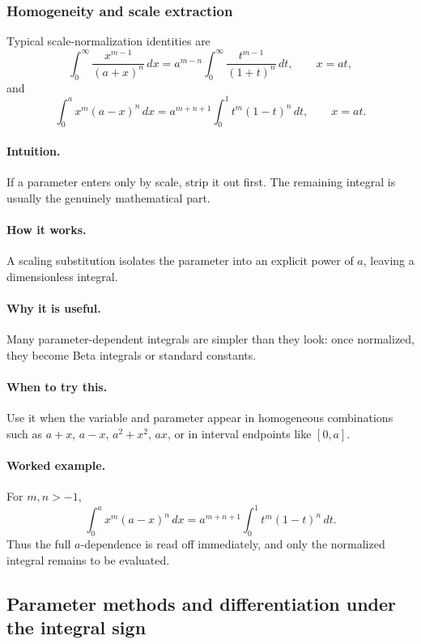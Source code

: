 \documentclass[12pt]{article}
\begin{document}
\newpage
\subsubsection{Homogeneity and scale extraction}
Typical scale-normalization identities are
\[
\int_0^\infty \frac{x^{m-1}}{(a+x)^n}\,dx
= a^{m-n}\int_0^\infty \frac{t^{m-1}}{(1+t)^n}\,dt,
\qquad x=at,
\]
and
\[
\int_0^a x^m(a-x)^n\,dx
= a^{m+n+1}\int_0^1 t^m(1-t)^n\,dt,
\qquad x=at.
\]

\paragraph{Intuition.}
If a parameter enters only by scale, strip it out first. The remaining integral is usually the genuinely mathematical part.

\paragraph{How it works.}
A scaling substitution isolates the parameter into an explicit power of \(a\), leaving a dimensionless integral.

\paragraph{Why it is useful.}
Many parameter-dependent integrals are simpler than they look: once normalized, they become Beta integrals or standard constants.

\paragraph{When to try this.}
Use it when the variable and parameter appear in homogeneous combinations such as \(a+x\), \(a-x\), \(a^2+x^2\), \(ax\), or in interval endpoints like \([0,a]\).

\paragraph{Worked example.}
For \(m,n>-1\),
\[
\int_0^a x^m(a-x)^n\,dx
=a^{m+n+1}\int_0^1 t^m(1-t)^n\,dt.
\]
Thus the full \(a\)-dependence is read off immediately, and only the normalized integral remains to be evaluated.

\newpage
\subsection{Parameter methods and differentiation under the integral sign}
\end{document}
